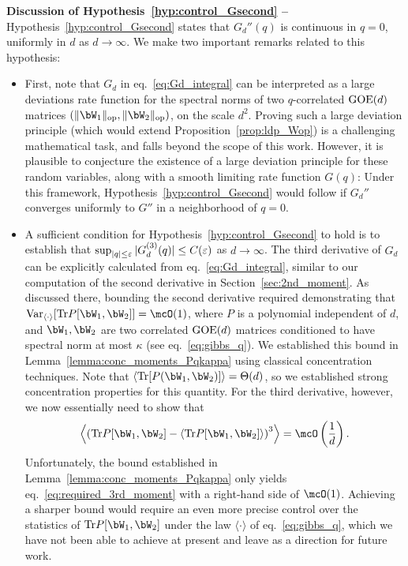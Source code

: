 \noindent
\textbf{Discussion of Hypothesis~\ref{hyp:control_Gsecond} --}
Hypothesis~\ref{hyp:control_Gsecond} states that $G_d''(q)$ is continuous in $q = 0$, uniformly in $d$ as $d \to \infty$.
We make two important remarks related to this hypothesis:
\begin{itemize}[leftmargin=*]
    \item First, note that $G_d$ in eq.~\eqref{eq:Gd_integral} can be interpreted as a large deviations rate function for the spectral norms of two $q$-correlated $\mathrm{GOE}(d)$ matrices $(\|\bW_1\|_\op, \|\bW_2\|_\op)$, 
    on the scale $d^2$. Proving such a large deviation principle (which would extend Proposition~\ref{prop:ldp_Wop}) is a challenging mathematical task, and falls beyond the scope of this work.
    However, it is plausible to conjecture the existence of a large deviation principle for these random variables, along with a smooth limiting rate function $G(q)$: 
    Under this framework, Hypothesis~\ref{hyp:control_Gsecond} would follow if $G_d''$ converges uniformly to $G''$ in a neighborhood of $q = 0$.
    
    \item A sufficient condition for Hypothesis~\ref{hyp:control_Gsecond} to hold is to establish that $\sup_{|q| \leq \varepsilon} |G_d^{(3)}(q)| \leq C(\varepsilon)$ as $d \to \infty$.
    The third derivative of $G_d$ can be explicitly calculated from eq.~\eqref{eq:Gd_integral}, similar to our computation of the second derivative in Section~\ref{sec:2nd_moment}.
    As discussed there, bounding the second derivative required demonstrating that $\Var_{\langle \cdot \rangle}[\Tr P[\bW_1, \bW_2]] = \mcO(1)$, where $P$ is a polynomial independent of $d$, and $\bW_1, \bW_2$ are two correlated $\mathrm{GOE}(d)$ matrices conditioned to have spectral norm at most $\kappa$ (see eq.~\eqref{eq:gibbs_q}).
    We established this bound in Lemma~\ref{lemma:conc_moments_Pqkappa} using classical concentration techniques.
    Note that $\langle \Tr[P(\bW_1, \bW_2)]\rangle = \Theta(d)$, so we established strong concentration properties for this quantity.
    For the third derivative, however, we now essentially need to show that
    \begin{equation}\label{eq:required_3rd_moment}
        \left\langle\left(\Tr P[\bW_1, \bW_2] - \langle \Tr P[\bW_1, \bW_2] \rangle\right)^3\right\rangle = \mcO\left(\frac{1}{d}\right).
    \end{equation}
    Unfortunately, the bound established in Lemma~\ref{lemma:conc_moments_Pqkappa} only yields eq.~\eqref{eq:required_3rd_moment} 
    with a right-hand side of $\mcO(1)$.
    Achieving a sharper bound would require an even more precise control over the statistics of
    $\Tr P[\bW_1, \bW_2]$
    under the law $\langle \cdot \rangle$ of eq.~\eqref{eq:gibbs_q}, 
    which we have not been able to achieve at present and leave as a direction for future work.
\end{itemize}

